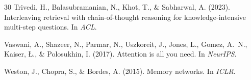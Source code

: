 \documentclass[11pt,a4paper]{article}
\begin{document}
\begin{thebibliography}{30}
Trivedi, H., Balasubramanian, N., Khot, T., \& Sabharwal, A. (2023).
\newblock Interleaving retrieval with chain-of-thought reasoning for knowledge-intensive multi-step questions.
\newblock In \textit{ACL}.

Vaswani, A., Shazeer, N., Parmar, N., Uszkoreit, J., Jones, L., Gomez, A.~N., Kaiser, {\L}., \& Polosukhin, I. (2017).
\newblock Attention is all you need.
\newblock In \textit{NeurIPS}.

Weston, J., Chopra, S., \& Bordes, A. (2015).
\newblock Memory networks.
\newblock In \textit{ICLR}.

\end{thebibliography}
\end{document}

